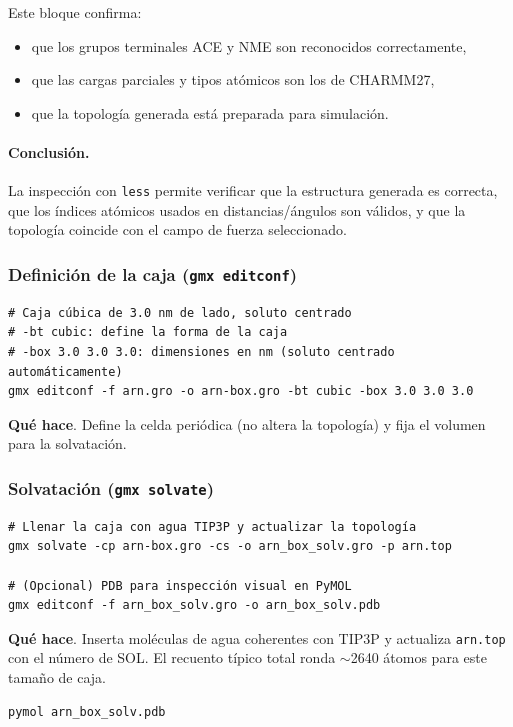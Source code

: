 \documentclass[12pt,a4paper]{article}
\begin{document}
Este bloque confirma:
\begin{itemize}
  \item que los grupos terminales ACE y NME son reconocidos correctamente,
  \item que las cargas parciales y tipos atómicos son los de CHARMM27,
  \item que la topología generada está preparada para simulación.
\end{itemize}

\paragraph*{Conclusión.}  
La inspección con \texttt{less} permite verificar que la estructura generada es 
correcta, que los índices atómicos usados en distancias/ángulos son válidos, y 
que la topología coincide con el campo de fuerza seleccionado.

\subsubsection*{Definición de la caja (\texttt{gmx editconf})}
\begin{lstlisting}[style=bashstyle]
# Caja cúbica de 3.0 nm de lado, soluto centrado
# -bt cubic: define la forma de la caja
# -box 3.0 3.0 3.0: dimensiones en nm (soluto centrado automáticamente)
gmx editconf -f arn.gro -o arn-box.gro -bt cubic -box 3.0 3.0 3.0
\end{lstlisting}
\textbf{Qué hace}. Define la celda periódica (no altera la topología) y fija el volumen para la solvatación.

\subsubsection*{Solvatación (\texttt{gmx solvate})}
\begin{lstlisting}[style=bashstyle]
# Llenar la caja con agua TIP3P y actualizar la topología
gmx solvate -cp arn-box.gro -cs -o arn_box_solv.gro -p arn.top

# (Opcional) PDB para inspección visual en PyMOL
gmx editconf -f arn_box_solv.gro -o arn_box_solv.pdb
\end{lstlisting}
\textbf{Qué hace}. Inserta moléculas de agua coherentes con TIP3P y actualiza \texttt{arn.top} con el número de SOL. El recuento típico total ronda \(\sim\)2640 átomos para este tamaño de caja.

\begin{lstlisting}[style=bashstyle]
pymol arn_box_solv.pdb
\end{lstlisting}
\end{document}
